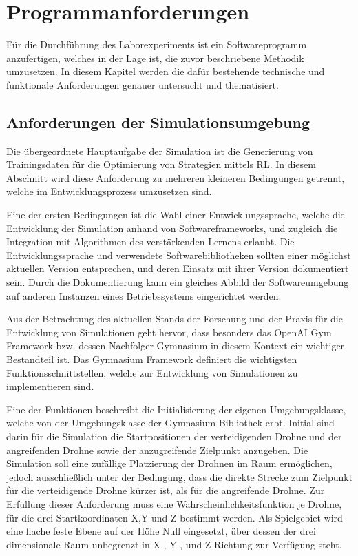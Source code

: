 \section{Programmanforderungen}

Für die Durchführung des Laborexperiments ist ein Softwareprogramm anzufertigen, welches in der Lage ist, die zuvor beschriebene Methodik umzusetzen.
In diesem Kapitel werden die dafür bestehende technische und funktionale Anforderungen genauer untersucht und thematisiert. 

\subsection{Anforderungen der Simulationsumgebung}

Die übergeordnete Hauptaufgabe der Simulation ist die Generierung von Trainingsdaten für die Optimierung von Strategien mittels RL.
In diesem Abschnitt wird diese Anforderung zu mehreren kleineren Bedingungen getrennt, welche im Entwicklungsprozess umzusetzen sind.

Eine der ersten Bedingungen ist die Wahl einer Entwicklungssprache, welche die Entwicklung der Simulation anhand von Softwareframeworks, und zugleich die Integration mit Algorithmen des verstärkenden Lernens erlaubt.
Die Entwicklungssprache und verwendete Softwarebibliotheken sollten einer möglichst aktuellen Version entsprechen, und deren Einsatz mit ihrer Version dokumentiert sein.
Durch die Dokumentierung kann ein gleiches Abbild der Softwareumgebung auf anderen Instanzen eines Betriebssystems eingerichtet werden. 

Aus der Betrachtung des aktuellen Stands der Forschung und der Praxis für die Entwicklung von Simulationen geht hervor, dass besonders das OpenAI Gym Framework bzw. dessen Nachfolger Gymnasium in diesem Kontext ein wichtiger Bestandteil ist.
Das Gymnasium Framework definiert die wichtigsten Funktionsschnittstellen, welche zur Entwicklung von Simulationen zu implementieren sind.

Eine der Funktionen beschreibt die Initialisierung der eigenen Umgebungsklasse, welche von der Umgebungsklasse der Gymnasium-Bibliothek erbt.
Initial sind darin für die Simulation die Startpositionen der verteidigenden Drohne und der angreifenden Drohne sowie der anzugreifende Zielpunkt anzugeben.
Die Simulation soll eine zufällige Platzierung der Drohnen im Raum ermöglichen, jedoch ausschließlich unter der Bedingung, dass die direkte Strecke zum Zielpunkt für die verteidigende Drohne kürzer ist, als für die angreifende Drohne.
Zur Erfüllung dieser Anforderung muss eine Wahrscheinlichkeitsfunktion je Drohne, für die drei Startkoordinaten X,Y und Z bestimmt werden.
Als Spielgebiet wird eine flache feste Ebene auf der Höhe Null eingesetzt, über dessen der drei dimensionale Raum unbegrenzt in X-, Y-, und Z-Richtung zur Verfügung steht.

